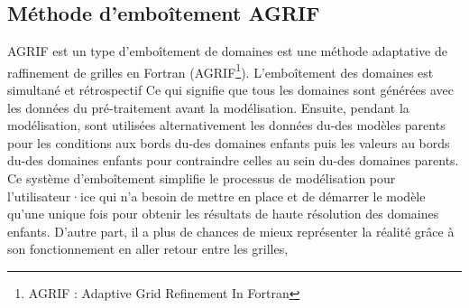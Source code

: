 \documentclass[10pt,a4paper,titlepage]{article}
\begin{document}
\subsection{Méthode d'emboîtement AGRIF}
\label{anx:AGRIF}
AGRIF est un type d'emboîtement de domaines est une méthode adaptative de raffinement de grilles en Fortran (AGRIF\footnote{AGRIF : Adaptive Grid Refinement In Fortran}).
L'emboîtement des domaines est simultané et rétrospectif
Ce qui signifie que tous les domaines sont générées avec les données du pré-traitement avant la modélisation.
Ensuite, pendant la modélisation, sont utilisées alternativement les données du-des modèles parents pour les conditions aux bords du-des domaines enfants puis les valeurs au bords du-des domaines enfants pour contraindre celles au sein du-des domaines parents.
Ce système d'emboîtement simplifie le processus de modélisation pour l'utilisateur·ice qui n'a besoin de mettre en place et de démarrer le modèle qu'une unique fois pour obtenir les résultats de haute résolution des domaines enfants.
D'autre part, il a plus de chances de mieux représenter la réalité grâce à son fonctionnement en aller retour entre les grilles,
\end{document}
